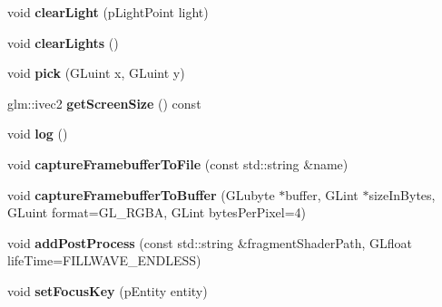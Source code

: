 \begin{DoxyCompactItemize}
\item 
\hypertarget{classfillwave_1_1Engine_a54d9508e54fc6e503701c52704027c82}{}void {\bfseries clear\+Light} (p\+Light\+Point light)\label{classfillwave_1_1Engine_a54d9508e54fc6e503701c52704027c82}

\item 
\hypertarget{classfillwave_1_1Engine_a6e6a32a9f0731403d647f76c73c954c1}{}void {\bfseries clear\+Lights} ()\label{classfillwave_1_1Engine_a6e6a32a9f0731403d647f76c73c954c1}

\item 
\hypertarget{classfillwave_1_1Engine_a6433c8aa182194e019b5a8003a541ad8}{}void {\bfseries pick} (G\+Luint x, G\+Luint y)\label{classfillwave_1_1Engine_a6433c8aa182194e019b5a8003a541ad8}

\item 
\hypertarget{classfillwave_1_1Engine_aa8a511f8d92f5109c50c6b1bac4ebdc4}{}glm\+::ivec2 {\bfseries get\+Screen\+Size} () const \label{classfillwave_1_1Engine_aa8a511f8d92f5109c50c6b1bac4ebdc4}

\item 
\hypertarget{classfillwave_1_1Engine_a622e9159a52582ac0fadd7be6ad2d31a}{}void {\bfseries log} ()\label{classfillwave_1_1Engine_a622e9159a52582ac0fadd7be6ad2d31a}

\item 
\hypertarget{classfillwave_1_1Engine_a4e08aacaa4023e9a2688ed4fd0b4bd31}{}void {\bfseries capture\+Framebuffer\+To\+File} (const std\+::string \&name)\label{classfillwave_1_1Engine_a4e08aacaa4023e9a2688ed4fd0b4bd31}

\item 
\hypertarget{classfillwave_1_1Engine_a0d0b79df4b9f1589c526cdb7fbc0a968}{}void {\bfseries capture\+Framebuffer\+To\+Buffer} (G\+Lubyte $\ast$buffer, G\+Lint $\ast$size\+In\+Bytes, G\+Luint format=G\+L\+\_\+\+R\+G\+B\+A, G\+Lint bytes\+Per\+Pixel=4)\label{classfillwave_1_1Engine_a0d0b79df4b9f1589c526cdb7fbc0a968}

\item 
\hypertarget{classfillwave_1_1Engine_a73dd41624a311f1242ccddc4584f0ae2}{}void {\bfseries add\+Post\+Process} (const std\+::string \&fragment\+Shader\+Path, G\+Lfloat life\+Time=F\+I\+L\+L\+W\+A\+V\+E\+\_\+\+E\+N\+D\+L\+E\+S\+S)\label{classfillwave_1_1Engine_a73dd41624a311f1242ccddc4584f0ae2}

\item 
\hypertarget{classfillwave_1_1Engine_a27e7826505b51d009d13ab433b70e00b}{}void {\bfseries set\+Focus\+Key} (p\+Entity entity)\label{classfillwave_1_1Engine_a27e7826505b51d009d13ab433b70e00b}


\end{DoxyCompactItemize}
